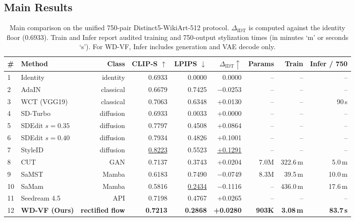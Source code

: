 \documentclass[letterpaper]{article}
\begin{document}
\subsection{Main Results}

\begin{table}[t]
\centering
\caption{Main comparison on the unified 750-pair Distinct5-WikiArt-512 protocol. $\Delta_{\mathrm{IDT}}$ is computed against the identity floor (0.6933). Train and Infer report audited training and 750-output stylization times (in minutes `m' or seconds `s'). For WD-VF, Infer includes generation and VAE decode only.}
\label{tab:main}
\scriptsize
\renewcommand{\arraystretch}{0.80}
\setlength{\tabcolsep}{7pt}
\begin{tabular}{@{}llrrrrrrr@{}}
\toprule
\# & Method & Class & CLIP-S $\uparrow$ & LPIPS $\downarrow$ & $\Delta_{\mathrm{IDT}} \uparrow$ & Params & Train & Infer / 750 \\
\midrule
1 & Identity & identity & 0.6933 & 0.0000 & 0.0000 & -- & -- & -- \\
2 & AdaIN & classical & 0.6679 & 0.7425 & $-$0.0253 & -- & -- & -- \\
3 & WCT (VGG19) & classical & 0.7063 & 0.6348 & +0.0130 & -- & -- & 90\,s \\
4 & SD-Turbo & diffusion & 0.6933 & 0.0033 & +0.0000 & -- & -- & -- \\
5 & SDEdit $s{=}0.35$ & diffusion & 0.7797 & 0.4508 & +0.0864 & -- & -- & -- \\
6 & SDEdit $s{=}0.40$ & diffusion & 0.7934 & 0.4826 & +0.1001 & -- & -- & -- \\
7 & StyleID & diffusion & \underline{0.8223} & 0.5523 & \underline{+0.1291} & -- & -- & -- \\
8 & CUT & GAN & 0.7137 & 0.3743 & +0.0204 & 7.0M & 322.6\,m & 5.0\,m \\
9 & SaMST & Mamba & 0.6183 & 0.7490 & $-$0.0749 & 8.3M & 39.5\,m & 10.0\,m \\
10 & SaMam & Mamba & 0.5816 & \underline{0.2434} & $-$0.1116 & -- & 436.0\,m & 17.6\,m \\
11 & Seedream 4.5 & API & 0.7198 & 0.4767 & +0.0265 & -- & -- & -- \\
\midrule
12 & \textbf{WD-VF (Ours)} & \textbf{rectified flow} & \textbf{0.7213} & \textbf{0.2868} & \textbf{+0.0280} & \textbf{903K} & \textbf{3.08\,m} & \textbf{83.7\,s} \\
\bottomrule
\end{tabular}
\end{table}
\end{document}

